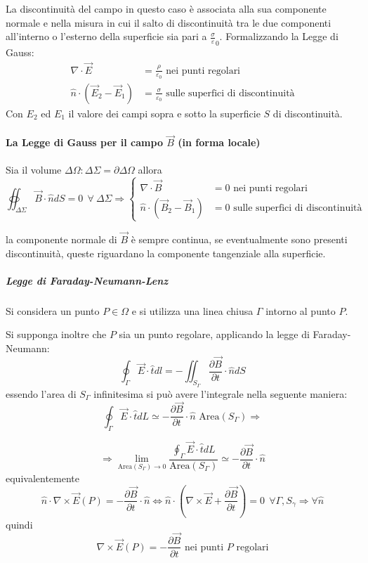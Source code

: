 La discontinuità del campo in questo caso è associata alla sua componente normale e nella misura 
in cui il salto di discontinuità tra le due componenti all'interno o l'esterno della superficie sia 
pari a $\frac{\sigma}{\varepsilon}_0$.
Formalizzando la Legge di Gauss:
\begin{align*}
\nabla\cdot\vec{E} &= \frac{\rho}{\varepsilon_0}\text{ nei punti regolari}\\
\hat{n}\cdot(\vec{E}_2-\vec{E}_1) &= \frac{\sigma}{\varepsilon_0}
\text{ sulle superfici di discontinuità}
\end{align*}
Con $E_2$ ed $E_1$ il valore dei campi sopra e sotto la superficie $S$ di discontinuità.

\paragraph{La Legge di Gauss per il campo $\vec{B}$ (in forma locale)}
Sia il volume $\Delta\Omega : \Delta\Sigma = \partial\Delta\Omega$ allora
\begin{equation}
\oiint_{\Delta\Sigma}\vec{B}\cdot\hat{n}dS = 0 \ \ \forall\ \Delta \Sigma \Rightarrow
\begin{cases}
\nabla\cdot\vec{B} &= 0\text{ nei punti regolari}\\
\hat{n}\cdot(\vec{B}_2-\vec{B}_1) &= 0 \text{ sulle superfici di discontinuità}
\end{cases}
\end{equation}

la componente normale di $\vec{B}$ è sempre continua, se eventualmente sono presenti discontinuità,
queste riguardano la componente tangenziale alla superficie.

\subparagraph{Legge di Faraday-Neumann-Lenz}
Si considera un punto $P\in\Omega$ e si utilizza una linea chiusa $\Gamma$ intorno al punto $P$.

Si supponga inoltre che $P$ sia un punto regolare, applicando la legge di Faraday-Neumann:
$$
\oint_{\Gamma}\vec{E}\cdot\hat{t}dl = 
- \iint_{S_\Gamma} \frac{\partial\vec{B}}{\partial t}\cdot\hat{n}dS
$$
essendo l'area di $S_\Gamma$ infinitesima si può avere l'integrale nella seguente maniera:
$$
\oint_{\Gamma}\vec{E}\cdot\hat{t}dL \simeq - \frac{\partial\vec{B}}{\partial t} \cdot 
\hat{n}\text{ Area}(S_\Gamma)\Rightarrow
$$

$$
\Rightarrow
\lim_{\text{Area}(S_\Gamma)\to 0}
 \frac{\oint_{\Gamma}\vec{E}\cdot\hat{t}dL}{\text{Area}(S_\Gamma)} \simeq
- \frac{\partial\vec{B}}{\partial t}\cdot\hat{n}
$$
equivalentemente
$$
\hat{n}\cdot\nabla\times\vec{E}(P) = -\frac{\partial\vec{B}}{\partial t}\cdot\hat{n} 
\Leftrightarrow \hat{n}\cdot\left(\nabla\times\vec{E}+\frac{\partial\vec{B}}{\partial t}\right) = 0\ \ 
\forall \Gamma,S_\gamma\Rightarrow \forall \hat{n}
$$
quindi
\begin{equation}
\nabla\times\vec{E}(P) = -\frac{\partial\vec{B}}{\partial t} \text{ nei punti $P$ regolari}
\end{equation}

